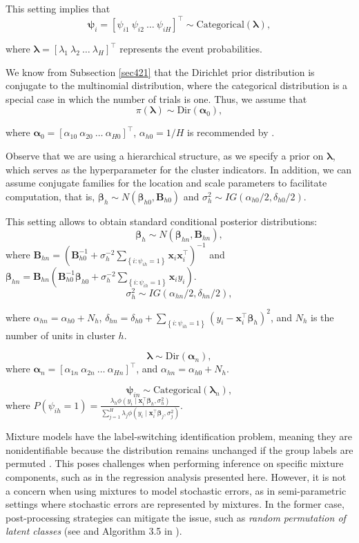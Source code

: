 This setting implies that  
\[
\bm{\psi}_i = [\psi_{i1} \  \psi_{i2} \ \dots \ \psi_{iH}]^{\top} \sim \text{Categorical}(\bm{\lambda}),
\] 
  
where \( \bm{\lambda} = [\lambda_1 \  \lambda_2 \  \dots \ \lambda_H]^{\top} \) represents the event probabilities.

We know from Subsection \ref{sec421} that the Dirichlet prior distribution is conjugate to the multinomial distribution, where the categorical distribution is a special case in which the number of trials is one. Thus, we assume that  
\[
\pi(\bm{\lambda}) \sim \text{Dir}(\bm{\alpha}_0),
\]  

where \( \bm{\alpha}_0 = [\alpha_{10} \ \alpha_{20} \ \dots \ \alpha_{H0}]^{\top} \), $\alpha_{h0}=1/H$ is recommended by \cite[p.~535]{gelman2021bayesian}.  

Observe that we are using a hierarchical structure, as we specify a prior on \( \bm{\lambda} \), which serves as the hyperparameter for the cluster indicators. In addition, we can assume conjugate families for the location and scale parameters to facilitate computation, that is, $\bm \beta_h\sim N(\bm{\beta}_{h0},\bm{B}_{h0})$ and $\sigma_h^2\sim IG(\alpha_{h0}/2,\delta_{h0}/2)$.

This setting allows to obtain standard conditional posterior distributions: $$\bm{\beta}_{h}\sim N(\bm{\beta}_{hn},\bm{B}_{hn}),$$ where $\bm{B}_{hn}=(\bm{B}_{h0}^{-1}+\sigma_h^{-2}\sum_{\left\{i:  \psi_{ih}=1\right\}}\bm{x}_i\bm{x}_i^{\top})^{-1}$ and $\bm{\beta}_{hn}=\bm{B}_{hn}(\bm{B}_{h0}^{-1}\bm{\beta}_{h0}+\sigma_h^{-2}\sum_{\left\{i:  \psi_{ih}=1\right\}}\bm{x}_iy_i)$.
$$\sigma_h^2\sim IG(\alpha_{hn}/2,\delta_{hn}/2),$$

where $\alpha_{hn}=\alpha_{h0}+N_h$, $\delta_{hn}=\delta_{h0}+\sum_{\left\{i:  \psi_{ih}=1\right\}}(y_i-\bm{x}_i^{\top}\bm{\beta}_h)^2$, and $N_h$ is the number of units in cluster $h$.

$$\bm{\lambda}\sim \text{Dir}(\bm{\alpha}_n),$$   
where $\bm{\alpha}_n=[\alpha_{1n} \  \alpha_{2n} \ \dots \ \alpha_{Hn}]^{\top}$, and $\alpha_{hn}=\alpha_{h0}+N_h$.

$$\bm{\psi}_{in}\sim \text{Categorical}(\bm{\lambda}_n),$$
where $P(\psi_{ih}=1)=\frac{\lambda_{h}\phi(y_i \mid \bm{x}_i^{\top}\bm{\beta}_h,\sigma_h^2)}{\sum_{j=1}^H\lambda_{j}\phi(y_i \mid \bm{x}_i^{\top}\bm{\beta}_j,\sigma_j^2)}$.

Mixture models have the label-switching identification problem, meaning they are nonidentifiable because the distribution remains unchanged if the group labels are permuted \cite{van2011bayesian}. This poses challenges when performing inference on specific mixture components, such as in the regression analysis presented here. However, it is not a concern when using mixtures to model stochastic errors, as in semi-parametric settings where stochastic errors are represented by mixtures. In the former case, post-processing strategies can mitigate the issue, such as \textit{random permutation of latent classes} (see \cite[p.~534]{gelman2021bayesian} and Algorithm 3.5 in \cite[p.~82]{fruhwirth2006finite}).  

